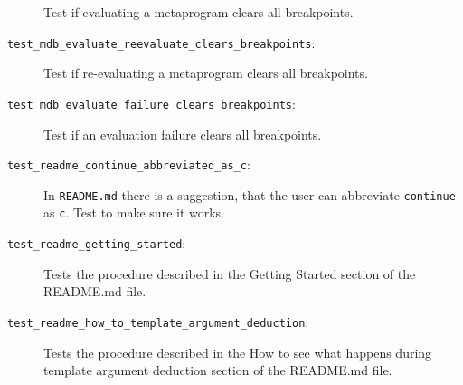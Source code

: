 \begin{description}
        Test if evaluating a metaprogram clears all breakpoints.
    \item[\texttt{test\_mdb\_evaluate\_reevaluate\_clears\_breakpoints}:]
        Test if re-evaluating a metaprogram clears all breakpoints.
    \item[\texttt{test\_mdb\_evaluate\_failure\_clears\_breakpoints}:]
        Test if an evaluation failure clears all breakpoints.
    \item[\texttt{test\_readme\_continue\_abbreviated\_as\_c}:]
        In \texttt{README.md} there is a suggestion, that the user can
        abbreviate \texttt{continue} as \texttt{c}. Test to make sure it works.
    \item[\texttt{test\_readme\_getting\_started}:]
        Tests the procedure described in the Getting Started section of the
        README.md file.
    \item[\texttt{test\_readme\_how\_to\_template\_argument\_deduction}:]
        Tests the procedure described in the How to see what happens during
        template argument deduction section of the README.md file.
\end{description}

